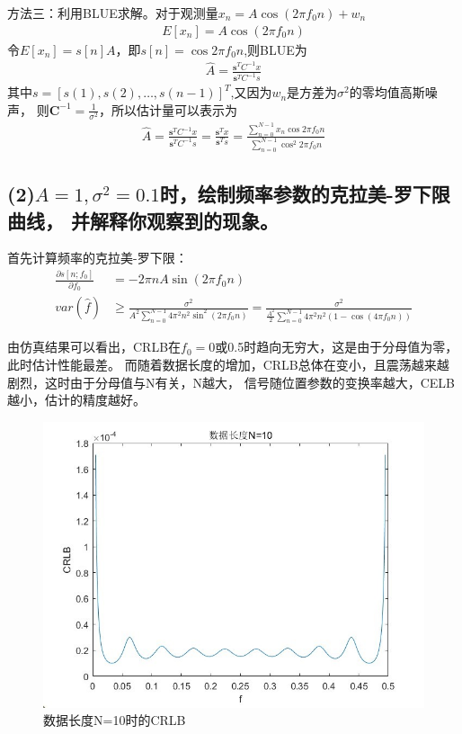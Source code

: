 \documentclass[fontset=windows]{article}
\numberwithin{figure}{section}
\begin{document}
方法三：利用BLUE求解。对于观测量\(x_n=A\cos(2\pi f_0 n)+w_n\)
\begin{align*}
	E[x_n]=A\cos(2\pi f_0 n)
\end{align*}
令\(E[x_n]=s[n]A\)，即\(s[n]=\cos 2\pi f_0 n\),则BLUE为
\begin{align*}
	\hat{A}=\frac{\mathbf{s}^TC^{-1}x}{\mathbf{s}^TC^{-1}s}
\end{align*}
其中\(s=[s(1),s(2),\ldots,s(n-1)]^T\),又因为\(w_n\)是方差为\(\sigma^2\)的零均值高斯噪声，
则\(\mathbf{C}^{-1}=\frac{1}{\sigma^2}\)，所以估计量可以表示为
\begin{align*}
	\hat{A}=\frac{\mathbf{s}^TC^{-1}x}{\mathbf{s}^TC^{-1}s}
	=\frac{\mathbf{s}^Tx}{\mathbf{s}^Ts}
	=\frac{\sum_{n=0}^{N-1}x_n \cos 2\pi f_0 n}{\sum_{n=0}^{N-1}\cos^2 2\pi f_0 n}
\end{align*}

\subsection*{(2)\(A=1,\sigma^2=0.1\)时，绘制频率参数的克拉美-罗下限曲线，
	并解释你观察到的现象。}

首先计算频率的克拉美-罗下限：
\begin{align*}
	\frac{\partial s[n;f_0]}{\partial f_0} & =-2\pi n A\sin(2\pi f_0 n) \\
	var(\hat{f})                           & \geq \frac{\sigma^2}
	{A^2\sum_{n=0}^{N-1}4\pi^2n^2\sin^2(2\pi f_0 n)}
	=\frac{\sigma^2}
	{\frac{A^2}{2}\sum_{n=0}^{N-1}4\pi^2n^2(1-\cos(4\pi f_0 n))}
\end{align*}

由仿真结果可以看出，CRLB在\(f_0=0\)或0.5时趋向无穷大，这是由于分母值为零，此时估计性能最差。
而随着数据长度的增加，CRLB总体在变小，且震荡越来越剧烈，这时由于分母值与N有关，N越大，
信号随位置参数的变换率越大，CELB越小，估计的精度越好。

\begin{figure}[H]
	\centering
	\includegraphics[scale=0.7]{fig1.jpg}
	\caption{数据长度N=10时的CRLB}
	\label{2.1}
\end{figure}
\end{document}
